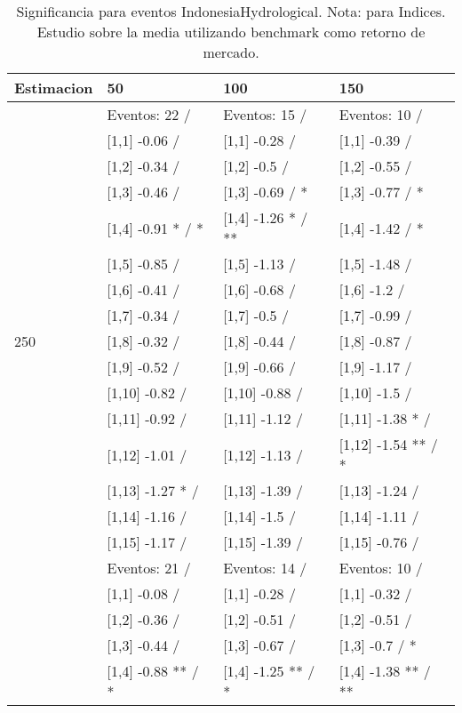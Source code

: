 \begin{table}

\caption{Significancia para eventos IndonesiaHydrological. Nota: para Indices. Estudio sobre la media utilizando benchmark como retorno de mercado.}
\centering
\begin{tabular}[t]{llll}
\toprule
Estimacion & 50 & 100 & 150\\
\midrule
 & Eventos:  22 / & Eventos:  15 / & Eventos:  10 /\\
 & {}[1,1] -0.06  / & {}[1,1] -0.28  / & {}[1,1] -0.39  /\\
 & {}[1,2] -0.34  / & {}[1,2] -0.5  / & {}[1,2] -0.55  /\\
 & {}[1,3] -0.46  / & {}[1,3] -0.69  / * & {}[1,3] -0.77  / *\\
 & {}[1,4] -0.91 * / * & {}[1,4] -1.26 * / ** & {}[1,4] -1.42  / *\\
\addlinespace
 & {}[1,5] -0.85  / & {}[1,5] -1.13  / & {}[1,5] -1.48  /\\
 & {}[1,6] -0.41  / & {}[1,6] -0.68  / & {}[1,6] -1.2  /\\
 & {}[1,7] -0.34  / & {}[1,7] -0.5  / & {}[1,7] -0.99  /\\
250 & {}[1,8] -0.32  / & {}[1,8] -0.44  / & {}[1,8] -0.87  /\\
 & {}[1,9] -0.52  / & {}[1,9] -0.66  / & {}[1,9] -1.17  /\\
\addlinespace
 & {}[1,10] -0.82  / & {}[1,10] -0.88  / & {}[1,10] -1.5  /\\
 & {}[1,11] -0.92  / & {}[1,11] -1.12  / & {}[1,11] -1.38 * /\\
 & {}[1,12] -1.01  / & {}[1,12] -1.13  / & {}[1,12] -1.54 ** / *\\
 & {}[1,13] -1.27 * / & {}[1,13] -1.39  / & {}[1,13] -1.24  /\\
 & {}[1,14] -1.16  / & {}[1,14] -1.5  / & {}[1,14] -1.11  /\\
\addlinespace
 & {}[1,15] -1.17  / & {}[1,15] -1.39  / & {}[1,15] -0.76  /\\
 & Eventos:  21 / & Eventos:  14 / & Eventos:  10 /\\
 & {}[1,1] -0.08  / & {}[1,1] -0.28  / & {}[1,1] -0.32  /\\
 & {}[1,2] -0.36  / & {}[1,2] -0.51  / & {}[1,2] -0.51  /\\
 & {}[1,3] -0.44  / & {}[1,3] -0.67  / & {}[1,3] -0.7  / *\\
\addlinespace
 & {}[1,4] -0.88 ** / * & {}[1,4] -1.25 ** / * & {}[1,4] -1.38 ** / **\\

\end{tabular}
\end{table}
